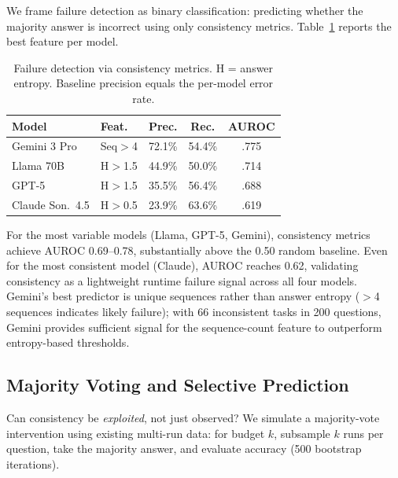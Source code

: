 \documentclass{article}
\begin{document}
We frame failure detection as binary classification: predicting whether the majority answer is incorrect using only consistency metrics. Table~\ref{tab:detection} reports the best feature per model.

\begin{table}[h]
\centering
\small
\caption{Failure detection via consistency metrics. H = answer entropy. Baseline precision equals the per-model error rate.}
\label{tab:detection}
\begin{tabular}{llccc}
\toprule
\textbf{Model} & \textbf{Feat.} & \textbf{Prec.} & \textbf{Rec.} & \textbf{AUROC} \\
\midrule
Gemini 3 Pro & Seq$>$4 & 72.1\% & 54.4\% & .775 \\
Llama 70B & H$>$1.5 & 44.9\% & 50.0\% & .714 \\
GPT-5 & H$>$1.5 & 35.5\% & 56.4\% & .688 \\
Claude Son.\ 4.5 & H$>$0.5 & 23.9\% & 63.6\% & .619 \\
\bottomrule
\end{tabular}
\end{table}

For the most variable models (Llama, GPT-5, Gemini), consistency metrics achieve AUROC 0.69--0.78, substantially above the 0.50 random baseline. Even for the most consistent model (Claude), AUROC reaches 0.62, validating consistency as a lightweight runtime failure signal across all four models. Gemini's best predictor is unique sequences rather than answer entropy ($>$4 sequences indicates likely failure); with 66 inconsistent tasks in 200 questions, Gemini provides sufficient signal for the sequence-count feature to outperform entropy-based thresholds.

\subsection{Majority Voting and Selective Prediction}
\label{sec:intervention}

Can consistency be \emph{exploited}, not just observed? We simulate a majority-vote intervention using existing multi-run data: for budget $k$, subsample $k$ runs per question, take the majority answer, and evaluate accuracy (500 bootstrap iterations).
\end{document}
